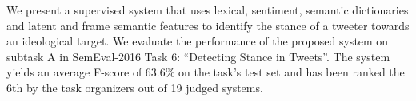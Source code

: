 We present a supervised system that uses lexical, sentiment, semantic dictionaries and latent and frame semantic features to identify the stance of a tweeter towards an ideological target. We evaluate the performance of the proposed system on subtask A in SemEval-2016 Task 6: ``Detecting Stance in Tweets''. The system yields an average F-score of 63.6\% on the task's test set and has been ranked the 6th by the task organizers out of 19 judged systems.
